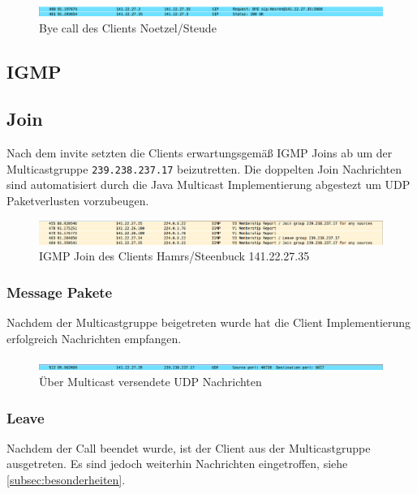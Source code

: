 \documentclass[10pt]{scrartcl}
\begin{document}
	\begin{figure}[htb]
        \centering
         \includegraphics[width=\textwidth]{img/bye}
         \caption{Bye call des Clients Noetzel/Steude}
        \label{img:byes}
	\end{figure}		
	

\subsection{IGMP}

	\subsection{Join}
	Nach dem invite setzten die Clients erwartungsgemäß IGMP Joins ab um der Multicastgruppe \verb!239.238.237.17! beizutretten. Die doppelten Join Nachrichten sind automatisiert durch die Java Multicast Implementierung abgestezt um UDP Paketverlusten vorzubeugen.
	
	\begin{figure}[htb]
        \centering
         \includegraphics[width=\textwidth]{img/join}
         \caption{IGMP Join des Clients Hamrs/Steenbuck 141.22.27.35}
        \label{img:join}
	\end{figure}	

	
	\subsubsection{Message Pakete}
	Nachdem der Multicastgruppe	beigetreten wurde hat die Client Implementierung erfolgreich Nachrichten empfangen. 
	
	\begin{figure}[htb]
        \centering
         \includegraphics[width=\textwidth]{img/udpMessage}
         \caption{Über Multicast versendete UDP Nachrichten}
        \label{img:udpMessage}
	\end{figure}	
	
	\subsubsection{Leave}
	Nachdem der Call beendet wurde, ist der Client aus der Multicastgruppe ausgetreten. Es sind jedoch weiterhin Nachrichten eingetroffen, siehe \ref{subsec:besonderheiten}.
	
\end{document}

